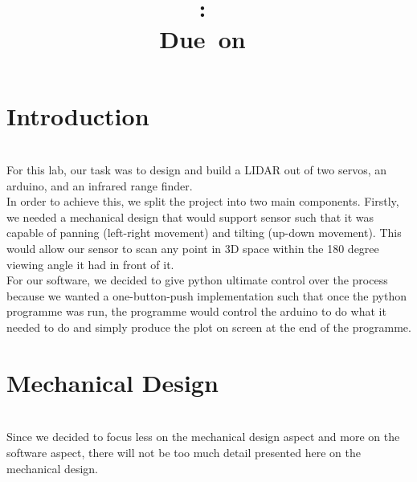 \documentclass{article}
\title{
\vspace{2in}
\textmd{\textbf{\hmwkClass:\ \hmwkTitle}}\\
\normalsize\vspace{0.1in}\small{Due\ on\ \hmwkDueDate}\\
\vspace{3in}
}
\author{\textbf{\hmwkAuthorName}}
\date{} %
\begin{document}
\maketitle
\newpage
\section{Introduction} \ \\
For this lab, our task was to design and build a LIDAR out of two servos, an arduino, and an infrared range finder. \\

In order to achieve this, we split the project into two main components. Firstly, we needed a mechanical design that would support sensor such that it was capable of panning (left-right movement) and tilting (up-down movement). This would allow our sensor to scan any point in 3D space within the 180 degree viewing angle it had in front of it. \\

For our software, we decided to give python ultimate control over the process because we wanted a one-button-push implementation such that once the python programme was run, the programme would control the arduino to do what it needed to do and simply produce the plot on screen at the end of the programme.

\section{Mechanical Design}\ \\
Since we decided to focus less on the mechanical design aspect and more on the software aspect, there will not be too much detail presented here on the mechanical design. \\
\end{document}
